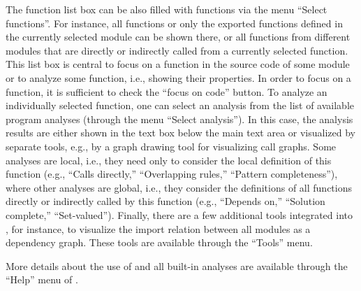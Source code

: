 The function list box can be also filled with functions
via the menu ``Select functions''. For instance, all functions
or only the exported functions defined in the currently selected
module can be shown there, or all functions from different modules
that are directly or indirectly called from
a currently selected function.
This list box is central to focus on a function in the
source code of some module or to analyze some function,
i.e., showing their properties. In order to focus on a function,
it is sufficient to check the ``focus on code'' button.
To analyze an individually selected function, one can
select an analysis from the list of available program analyses
(through the menu ``Select analysis'').
In this case, the analysis results are either shown
in the text box below the main text area
or visualized by separate tools, e.g., by a graph drawing tool for
visualizing call graphs.
Some analyses are local, i.e., they need only to consider the local definition
of this function (e.g., ``Calls directly,'' ``Overlapping rules,''
``Pattern completeness''),
where other analyses are global, i.e.,
they consider the definitions of all functions directly or indirectly called
by this function (e.g., ``Depends on,'' ``Solution complete,''
``Set-valued'').
%
Finally, there are a few additional tools integrated into \cb,
for instance, to visualize the import relation between all modules
as a dependency graph. These tools are available through the ``Tools'' menu.

More details about the use of \cb and all built-in analyses
are available through the ``Help'' menu of \cb.

